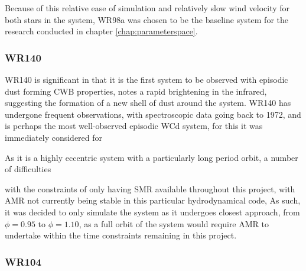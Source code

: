 


Because of this relative ease of simulation and relatively slow wind velocity for both stars in the system, WR98a was chosen to be the baseline system for the research conducted in chapter \ref{chap:parameterspace}.

\subsubsection{WR140}


WR140 is significant in that it is the first system to be observed with episodic dust forming CWB properties, \textcite{williamsCondensationShellHD1978} notes a rapid brightening in the infrared, suggesting the formation of a new shell of dust around the system.
WR140 has undergone frequent observations, with spectroscopic data going back to 1972, and is perhaps the most well-observed episodic WCd system, for this it was immediately considered for 


As it is a highly eccentric system with a particularly long period orbit, a number of difficulties 

with the constraints of only having SMR available throughout this project, with AMR not currently being stable in this particular hydrodynamical code, 
As such, it was decided to only simulate the system as it undergoes closest approach, from $\phi = 0.95$ to $\phi = 1.10$, as a full orbit of the system would require AMR to undertake within the time constraints remaining in this project. 


\subsubsection{WR104}

